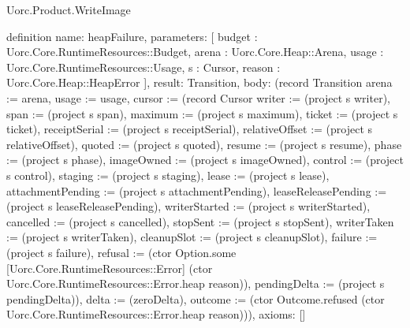 \begin{lexlean}{Uorc.Product.WriteImage}
\begin{semanticmodule}
definition{
  name: heapFailure,
  parameters: [
    budget : Uorc.Core.RuntimeResources::Budget,
    arena : Uorc.Core.Heap::Arena,
    usage : Uorc.Core.RuntimeResources::Usage,
    s : Cursor,
    reason : Uorc.Core.Heap::HeapError
  ],
  result: Transition,
  body: (record Transition {arena := arena, usage := usage, cursor := (record Cursor {writer := (project s writer), span := (project s span), maximum := (project s maximum), ticket := (project s ticket), receiptSerial := (project s receiptSerial), relativeOffset := (project s relativeOffset), quoted := (project s quoted), resume := (project s resume), phase := (project s phase), imageOwned := (project s imageOwned), control := (project s control), staging := (project s staging), lease := (project s lease), attachmentPending := (project s attachmentPending), leaseReleasePending := (project s leaseReleasePending), writerStarted := (project s writerStarted), cancelled := (project s cancelled), stopSent := (project s stopSent), writerTaken := (project s writerTaken), cleanupSlot := (project s cleanupSlot), failure := (project s failure), refusal := (ctor Option.some [Uorc.Core.RuntimeResources::Error] (ctor Uorc.Core.RuntimeResources::Error.heap reason)), pendingDelta := (project s pendingDelta)}), delta := (zeroDelta), outcome := (ctor Outcome.refused (ctor Uorc.Core.RuntimeResources::Error.heap reason))}),
  axioms: []
}


\end{semanticmodule}
\end{lexlean}
